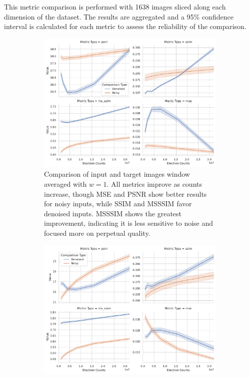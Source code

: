 This metric comparison is performed with \num{1638} images sliced along each dimension of the dataset. The results are aggregated and a 95\% confidence interval is calculated for each metric to assess the reliability of the comparison. 
\begin{figure}
    \centering
    \begin{subfigure}[t]{0.48\textwidth}
        \centering
        \includegraphics[width=\textwidth]{images/metrics_comparison_denoised_noisy.pdf}
        \caption{Comparison of input and target images window averaged with $w=1$. All metrics improve as counts increase, though \gls{MSE} and \gls{PSNR} show better results for noisy inputs, while \gls{SSIM} and \gls{MSSSIM} favor denoised inputs. \gls{MSSSIM} shows the greatest improvement, indicating it is less sensitive to noise and focused more on perpetual quality.}
        \label{fig:metrics-comparison}
    \end{subfigure}
    \hfill
    \begin{subfigure}[t]{0.48\textwidth}
        \centering
        \includegraphics[width=\textwidth]{images/metrics_comparison_denoised_noisy_averaged.pdf}

\end{subfigure}
\end{figure}
